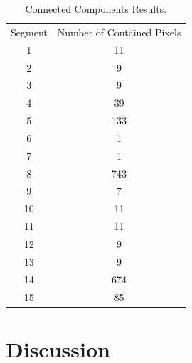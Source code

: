 \documentclass[./rarnold_project_89.tex]{subfiles}
\begin{document}
	\begin{table}[htbp]
	\centering
	\caption{Connected Components Results.}
	\label{p5table}
	\begin{tabular}{|c|c|}
	\hline
	
Segment & Number of Contained Pixels \\ \hhline{|=|=|}
1 & 11 \\ \hline
2 & 9 \\ \hline
3 & 9\\ \hline
4 & 39\\ \hline
5 & 133\\ \hline
6 & 1\\ \hline
7 & 1\\ \hline
8 & 743\\ \hline
9 & 7\\ \hline
10 & 11\\ \hline
11 & 11\\ \hline
12 & 9\\ \hline
13 & 9\\ \hline
14 & 674\\ \hline
15 & 85\\ \hline
	\end{tabular}
	\end{table}	
	
\clearpage

\section*{Discussion}
\end{document}

